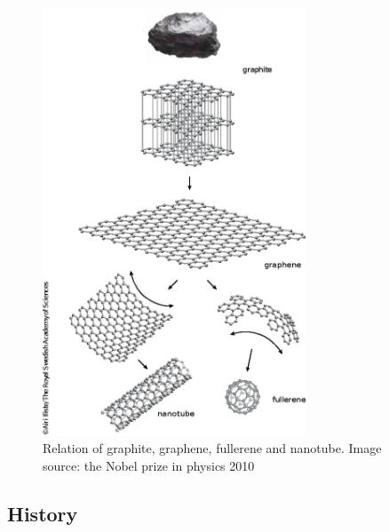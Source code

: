 \begin{figure}[htbp] 
\centering  
\includegraphics[width=0.7\textwidth]{gra_grap.eps}
\caption[Relation of graphite, graphene, fullerene and nanotube]{Relation of graphite, graphene, fullerene and nanotube. Image source: the Nobel prize in physics 2010 \cite{gra_grap}}  
\label{fig:gra_grap}
\end{figure} 


\subsection{History}

